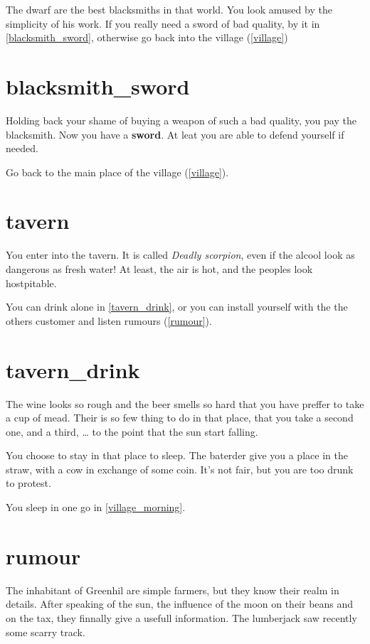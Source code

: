 The dwarf are the best blacksmiths in that world. You look amused by the
simplicity of his work. If you really need a sword of bad quality, by it in
\ref{blacksmith_sword}, otherwise go back into the village (\ref{village})

\section{blacksmith_sword}

Holding back your shame of buying a weapon of such a bad quality, you pay the
blacksmith. Now you have a \textbf{sword}. At leat you are able to defend
yourself if needed.

Go back to the main place of the village (\ref{village}).

\section{tavern}

You enter into the tavern. It is called \textit{Deadly scorpion}, even if the
alcool look as dangerous as fresh water! At least, the air is hot, and the
peoples look hostpitable.

You can drink alone in \ref{tavern_drink}, or you can install yourself with the
the others customer and listen rumours (\ref{rumour}).

\section{tavern_drink}

The wine looks so rough and the beer smells so hard that you have preffer to
take a cup of mead. Their is so few thing to do in that place, that you take a
second one, and a third, … to the point that the sun start falling.

You choose to stay in that place to sleep. The baterder give you a place in the
straw, with a cow in exchange of some coin. It's not fair, but you are too drunk
to protest.

You sleep in one go in \ref{village_morning}.

\section{rumour}

The inhabitant of Greenhil are simple farmers, but they know their realm in
details. After speaking of the sun, the influence of the moon on their beans and
on the tax, they finnally give a usefull information. The lumberjack saw
recently some scarry track.

